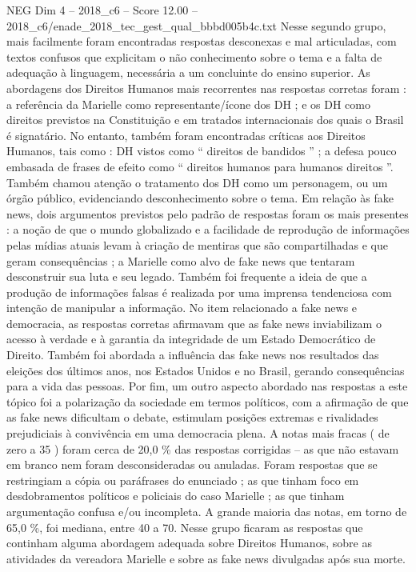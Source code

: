 \begin{textsample}{NEG Dim 4 – 2018\_c6 – Score 12.00 – 2018\_c6/enade\_2018\_tec\_gest\_qual\_bbbd005b4c.txt}
Nesse segundo grupo, mais facilmente foram encontradas respostas desconexas e mal articuladas, com textos confusos que explicitam o não conhecimento sobre o tema e a falta de adequação à linguagem, necessária a um concluinte do ensino superior.
As abordagens dos Direitos Humanos mais recorrentes nas respostas corretas foram : a referência da Marielle como representante/ícone dos DH ; e os DH como direitos previstos na Constituição e em tratados internacionais dos quais o Brasil é signatário.
No entanto, também foram encontradas críticas aos Direitos Humanos, tais como : DH vistos como “ direitos de bandidos ” ; a defesa pouco embasada de frases de efeito como “ direitos humanos para humanos direitos ”.
Também chamou atenção o tratamento dos DH como um personagem, ou um órgão público, evidenciando desconhecimento sobre o tema.
Em relação às fake news, dois argumentos previstos pelo padrão de respostas foram os mais presentes : a noção de que o mundo globalizado e a facilidade de reprodução de informações pelas mídias atuais levam à criação de mentiras que são compartilhadas e que geram consequências ; a Marielle como alvo de fake news que tentaram desconstruir sua luta e seu legado.
Também foi frequente a ideia de que a produção de informações falsas é realizada por uma imprensa tendenciosa com intenção de manipular a informação.
No item relacionado a fake news e democracia, as respostas corretas afirmavam que as fake news inviabilizam o acesso à verdade e à garantia da integridade de um Estado Democrático de Direito.
Também foi abordada a influência das fake news nos resultados das eleições dos últimos anos, nos Estados Unidos e no Brasil, gerando consequências para a vida das pessoas.
Por fim, um outro aspecto abordado nas respostas a este tópico foi a polarização da sociedade em termos políticos, com a afirmação de que as fake news dificultam o debate, estimulam posições extremas e rivalidades prejudiciais à convivência em uma democracia plena.
A notas mais fracas ( de zero a 35 ) foram cerca de 20,0 \% das respostas corrigidas – as que não estavam em branco nem foram desconsideradas ou anuladas.
Foram respostas que se restringiam a cópia ou paráfrases do enunciado ; as que tinham foco em desdobramentos políticos e policiais do caso Marielle ; as que tinham argumentação confusa e/ou incompleta.
A grande maioria das notas, em torno de 65,0 \%, foi mediana, entre 40 a 70.
Nesse grupo ficaram as respostas que continham alguma abordagem adequada sobre Direitos Humanos, sobre as atividades da vereadora Marielle e sobre as fake news divulgadas após sua morte.

\end{textsample}
